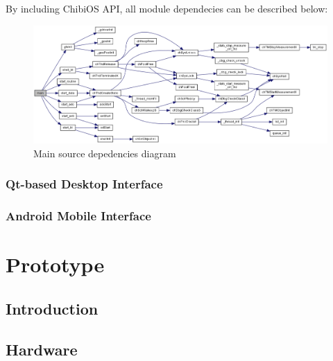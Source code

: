 \documentclass[12pt,]{book}
\begin{document}
	\newpage
	\begin{landscape}
		By including ChibiOS API, all module dependecies can be described below:
		\begin{figure}[H]
			\centering
			\includegraphics[width=\linewidth]{images/jw_ch_main}
			\caption{Main source depedencies diagram}
		\end{figure}
	\end{landscape}

	\newpage	
	\subsection{Qt-based Desktop Interface}
	
	\subsection{Android Mobile Interface}
	
	\newpage
	\chapter{Prototype}
	
	\section{Introduction}
	
	\section{Hardware}
	
\end{document}
